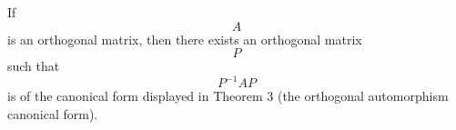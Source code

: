 If $$A$$ is an orthogonal matrix, then there exists an orthogonal matrix $$P$$ such that $$P^{-1}AP$$ is of the canonical form displayed in Theorem 3 (the orthogonal automorphism canonical form).
